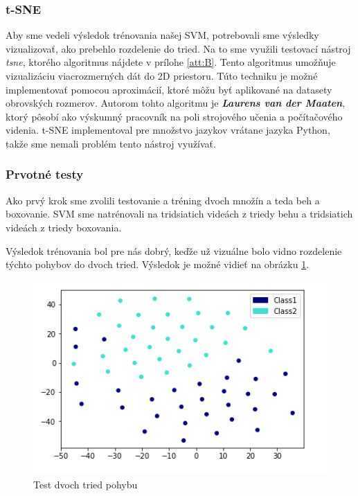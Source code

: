 \subsubsection{t-SNE}
Aby sme vedeli výsledok trénovania našej SVM, potrebovali sme výsledky vizualizovať, ako prebehlo rozdelenie do tried. Na to sme využili testovací nástroj \textit{\acrfull{tsne}}, ktorého algoritmus nájdete v prílohe \ref{att:B}. Tento algoritmus umožňuje vizualizáciu viacrozmerných dát do 2D priestoru. Túto techniku je možné implementovať pomocou aproximácií, ktoré môžu byť aplikované na datasety obrovských rozmerov. Autorom tohto algoritmu je \textbf{\textit{Laurens van der Maaten}}, ktorý pôsobí ako výskumný pracovník na poli strojového učenia a počítačového videnia. t-SNE implementoval pre množstvo jazykov vrátane jazyka Python, takže sme nemali problém tento nástroj využívať. \cite{c18}



\subsubsection{Prvotné testy}
Ako prvý krok sme zvolili testovanie a tréning dvoch množín a teda beh a boxovanie. SVM sme natrénovali na tridsiatich videách z triedy behu a tridsiatich videách z triedy boxovania. 

Výsledok trénovania bol pre nás dobrý, keďže už vizuálne bolo vidno rozdelenie týchto pohybov do dvoch tried. Výsledok je možné vidieť na obrázku \ref{Test2Class}. 

\begin{figure}[H]
  \centering
  \includegraphics[width=14cm]{img/test2classes.png}
  \caption{Test dvoch tried pohybu}
  \label{Test2Class}
\end{figure} 


